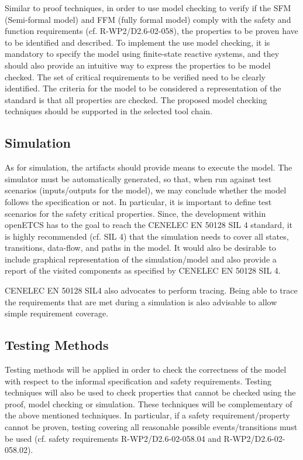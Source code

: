 Similar to proof techniques, in order to use model checking to verify if the SFM (Semi-formal model) and FFM (fully formal model) comply with the safety and function requirements (cf. R-WP2/D2.6-02-058), the properties to be proven have to be identified and described. To implement the use model checking, it is mandatory to specify the model using finite-state reactive systems, and they should also provide an intuitive way to express the properties to be model checked. The set of critical requirements to be verified need to be clearly identified. The criteria for the model to be considered a representation of the standard is that all properties are checked. The proposed model checking techniques should be supported in the selected tool chain.

\subsection{Simulation}
As for simulation, the artifacts should provide means to execute the model. The simulator must be automatically generated, so that, when run against test scenarios (inputs/outputs for the model), we may conclude whether the model follows the specification or not. In particular, it is important to define test scenarios for the safety critical properties. Since, the development within openETCS has to the goal to reach the CENELEC EN 50128 SIL 4 standard, it is highly recommended (cf. SIL 4) that the simulation needs to cover all states, transitions, data-flow, and paths in the model. It would also be desirable to include graphical representation of the simulation/model and also provide a report of the visited components as specified by CENELEC EN 50128 SIL 4. 

CENELEC EN 50128 SIL4 also advocates to perform tracing. Being able to trace the requirements that are met during a simulation is also advisable to allow simple requirement coverage. 


\subsection{Testing Methods}
Testing methods will be applied in order to check the correctness of the model with respect to the informal specification and safety requirements. Testing techniques will also be used to check properties that cannot be checked using the proof, model checking or simulation. These techniques will be complementary of the above mentioned techniques. In particular, if a safety requirement/property cannot be proven, testing covering all reasonable possible events/transitions must be used (cf. safety requirements R-WP2/D2.6-02-058.04 and R-WP2/D2.6-02-058.02).


